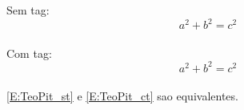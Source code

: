 
Sem tag: \begin{equation}\label{E:TeoPit_st}
    a^2 + b^2 = c^2
\end{equation} \\
Com tag: \begin{equation}\label{E:TeoPit_ct} 
    \tag{Teorema de Pitagoras}
    a^2 + b^2 = c^2
\end{equation} \\
\eqref{E:TeoPit_st} e \eqref{E:TeoPit_ct} sao equivalentes.
